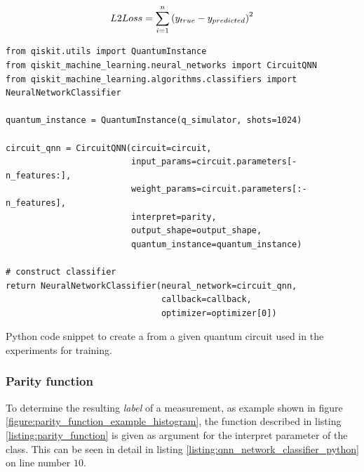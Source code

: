 \begin{equation}
    \centering
        L2Loss = \sum _{i=1}^n\left(y_{true}-y_{predicted}\right)^2
    \label{equation:l2loss}
\end{equation}

\begin{listing}[!h]
    \begin{verbatim}
from qiskit.utils import QuantumInstance
from qiskit_machine_learning.neural_networks import CircuitQNN
from qiskit_machine_learning.algorithms.classifiers import NeuralNetworkClassifier

quantum_instance = QuantumInstance(q_simulator, shots=1024)

circuit_qnn = CircuitQNN(circuit=circuit,
                         input_params=circuit.parameters[-n_features:],
                         weight_params=circuit.parameters[:-n_features],
                         interpret=parity,
                         output_shape=output_shape,
                         quantum_instance=quantum_instance)

# construct classifier
return NeuralNetworkClassifier(neural_network=circuit_qnn,
                               callback=callback,
                               optimizer=optimizer[0])
    \end{verbatim}
    \caption{Python code snippet to create a  from a given quantum circuit used in the experiments for training.}
    \label{listing:qnn_network_classifier_python}
\end{listing}

\subsubsection{Parity function}
\label{subsubsection:parity_function_explained}
To determine the resulting \textit{label} of a measurement, as example shown in figure \ref{figure:parity_function_example_histogram}, the  function described in listing \ref{listing:parity_function} is given as argument for the interpret parameter of the  class. This can be seen in detail in listing \ref{listing:qnn_network_classifier_python} on line number $10$. 

